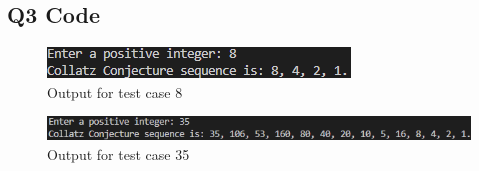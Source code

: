 \documentclass{article}
\begin{document}
\begin{flushleft}
    \section{Q3 Code}
    
    \begin{figure}[!h]
        \begin{centering}
          \includegraphics[scale=1]{Q3_p1.png}
          \caption{Output for test case 8}
        \end{centering}
      \end{figure}
    \begin{figure}[!h]
        \begin{centering}
          \includegraphics[scale=1]{Q3_p2.png}
          \caption{Output for test case 35}
        \end{centering}
    \end{figure}
\end{flushleft}
\end{document}
